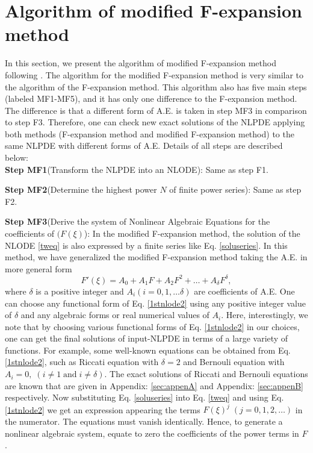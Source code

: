 \documentclass[prd,aps,floats,showkeys,nofootinbib,notitlepage]{revtex4-2}
\begin{document}
	
	
	\section{Algorithm of modified F-expansion method}\label{sec:mF}
	In this section, we present the algorithm of modified F-expansion method following \cite{modfexpn}.
	The algorithm for the modified F-expansion method \cite{modfexpn} is very similar to the algorithm of the F-expansion method. This algorithm also has five main steps (labeled MF1-MF5), and it has only one difference to the F-expansion method. The difference is that a different form of A.E. is taken in step MF3 in comparison to step F3. Therefore, one can check new exact solutions of the NLPDE applying both methods (F-expansion method and modified F-expansion method) to the same NLPDE with different forms of A.E. Details of all steps are described below:\\ 
	
	\textbf{Step MF1}(Transform the NLPDE into an NLODE): Same as step F1.
	
	\textbf{Step MF2}(Determine the highest power $N$ of finite power series):  Same as step F2.
	
	\textbf{Step MF3}(Derive the system of Nonlinear Algebraic Equations for the coefficients of $(F(\xi)$):
	In the modified F-expansion method, the solution of the NLODE \eqref{tweq} is also expressed by a finite series like Eq. \eqref{soluseries}. In this method, we have generalized the modified F-expansion method \cite{modfexpn} taking the A.E. in more general form
	\begin{equation}\label{1stnlode2}
		F'\left( \xi  \right) = {A_0} + {A_1}F + {A_2}{F^2} +  \ldots + {A_\delta }{F^\delta },
	\end{equation}
	where $\delta$ is a positive integer and $A_i(i=0,1,\ldots \delta)$ are coefficients of A.E. One can choose any functional form of Eq. \eqref{1stnlode2} using any positive integer value of $\delta$ and any algebraic forms or real numerical values of $A_i$. Here, interestingly, we note that by choosing various functional forms of Eq. \eqref{1stnlode2} in our choices, one can get the final solutions of input-NLPDE in terms of a large variety of functions. For example, some well-known equations can be obtained from Eq. \eqref{1stnlode2}, such as Riccati equation with $\delta=2$ and Bernouli equation with $A_i=0,\;(i\ne 1\; \text{and}\; i \ne \delta)$. The exact solutions of Riccati and Bernouli equations are known that are given in Appendix: \ref{sec:appenA} and Appendix: \ref{sec:appenB} respectively.
	Now substituting Eq. \eqref{soluseries} into Eq. \eqref{tweq} and using Eq. \eqref{1stnlode2} we get an expression appearing the terms $F(\xi)^j\;(j=0,1,2,\ldots)$ in the numerator. The equations must vanish identically. Hence, to generate a nonlinear algebraic system, equate to zero the coefficients of the power terms in $F$.
	
\end{document}
